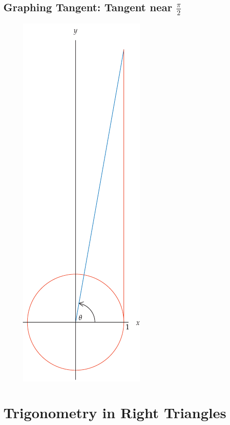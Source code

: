 \subsection{Graphing Tangent: Tangent near $\frac{\pi}{2}$}
\begin{figure}
    \centering
    \includegraphics[scale=0.28]{pics/12.png}
\end{figure}

\section{Trigonometry in Right Triangles}
